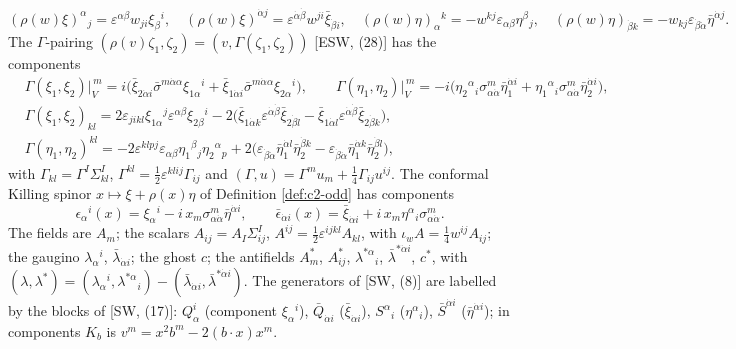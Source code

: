 \begin{definition}
\[
(\rho(w)\xi)^\alpha{}_j=\varepsilon^{\alpha\beta}w_{ji}\xi_\beta{}^i,\quad (\rho(w)\xi)^{\dot\alpha j}=\varepsilon^{\dot\alpha\dot\beta}w^{ji}\bar\xi_{\dot\beta i},\quad (\rho(w)\eta)_\alpha{}^k=-w^{kj}\varepsilon_{\alpha\beta}\eta^\beta{}_j,\quad (\rho(w)\eta)_{\dot\beta k}=-w_{kj}\varepsilon_{\dot\beta\dot\alpha}\bar\eta^{\dot\alpha j}.
\]
The $\Gamma$-pairing $(\rho(v)\zeta_1,\zeta_2)=(v,\Gamma(\zeta_1,\zeta_2))$ [ESW, (28)] has the components
\[
\begin{aligned}
&\Gamma(\xi_1,\xi_2)\big|_V^{\,m}=i\big(\bar\xi_{2\dot\alpha i}\bar\sigma^{m\dot\alpha\alpha}\xi_{1\alpha}{}^i+\bar\xi_{1\dot\alpha i}\bar\sigma^{m\dot\alpha\alpha}\xi_{2\alpha}{}^i\big),\qquad
\Gamma(\eta_1,\eta_2)\big|_V^{\,m}=-i\big(\eta_2{}^\alpha{}_i\sigma^m_{\alpha\dot\alpha}\bar\eta_1^{\dot\alpha i}+\eta_1{}^\alpha{}_i\sigma^m_{\alpha\dot\alpha}\bar\eta_2^{\dot\alpha i}\big),\\
&\Gamma(\xi_1,\xi_2)_{kl}=2\varepsilon_{jikl}\xi_{1\alpha}{}^j\varepsilon^{\alpha\beta}\xi_{2\beta}{}^i-2\big(\bar\xi_{1\dot\alpha k}\varepsilon^{\dot\alpha\dot\beta}\bar\xi_{2\dot\beta l}-\bar\xi_{1\dot\alpha l}\varepsilon^{\dot\alpha\dot\beta}\bar\xi_{2\dot\beta k}\big),\\
&\Gamma(\eta_1,\eta_2)^{kl}=-2\varepsilon^{klpj}\varepsilon_{\alpha\beta}\eta_1{}^\beta{}_j\eta_2{}^\alpha{}_p+2\big(\varepsilon_{\dot\beta\dot\alpha}\bar\eta_1^{\dot\alpha l}\bar\eta_2^{\dot\beta k}-\varepsilon_{\dot\beta\dot\alpha}\bar\eta_1^{\dot\alpha k}\bar\eta_2^{\dot\beta l}\big),
\end{aligned}
\]
with $\Gamma_{kl}=\Gamma^I\Sigma^I_{kl}$, $\Gamma^{kl}=\tfrac12\varepsilon^{klij}\Gamma_{ij}$ and $(\Gamma,u)=\Gamma^mu_m+\tfrac14\Gamma_{ij}u^{ij}$. The conformal Killing spinor $x\mapsto\xi+\rho(x)\eta$ of Definition \ref{def:c2-odd} has components
\begin{equation}
\epsilon_\alpha{}^i(x)=\xi_\alpha{}^i-i\,x_m\sigma^m_{\alpha\dot\alpha}\bar\eta^{\dot\alpha i},\qquad \bar\epsilon_{\dot\alpha i}(x)=\bar\xi_{\dot\alpha i}+i\,x_m\eta^\alpha{}_i\sigma^m_{\alpha\dot\alpha}.
\label{eq:c8-killing}
\end{equation}
The fields are $A_m$; the scalars $A_{ij}=A_I\Sigma^I_{ij}$, $A^{ij}=\tfrac12\varepsilon^{ijkl}A_{kl}$, with $\iota_wA=\tfrac14w^{ij}A_{ij}$; the gaugino $\lambda_\alpha{}^i$, $\bar\lambda_{\dot\alpha i}$; the ghost $c$; the antifields $A^*_m$, $A^*_{ij}$, $\lambda^{*\alpha}{}_i$, $\bar\lambda^{*\dot\alpha i}$, $c^*$, with $(\lambda,\lambda^*)=(\lambda_\alpha{}^i,\lambda^{*\alpha}{}_i)-(\bar\lambda_{\dot\alpha i},\bar\lambda^{*\dot\alpha i})$. The generators of [SW, (8)] are labelled by the blocks of [SW, (17)]: $Q^i_\alpha$ (component $\xi_\alpha{}^i$), $\bar Q_{\dot\alpha i}$ ($\bar\xi_{\dot\alpha i}$), $S^\alpha{}_i$ ($\eta^\alpha{}_i$), $\bar S^{\dot\alpha i}$ ($\bar\eta^{\dot\alpha i}$); in components $K_b$ is $v^m=x^2b^m-2(b\cdot x)x^m$.
\end{definition}

